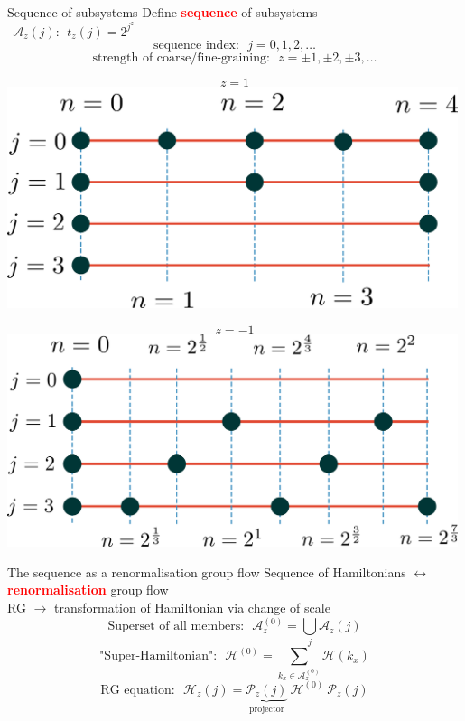 \documentclass[11pt,aspectratio=169]{beamer}
\newcommand{\focus}[1]{\textcolor{red}{\bf{#1}}}
\begin{document}
\begin{frame}{Sequence of subsystems}
	Define \focus{sequence} of subsystems\\[10pt]
{\large \(~ ~ \mathcal{A}_{z}(j): ~ ~ t_z(j) = 2^{j^z}\)}
\[\text{sequence index:}~ ~ ~ j = 0,1,2,\ldots\]
\[\text{strength of coarse/fine-graining:}~ ~ ~ z = \pm 1,\pm 2,\pm 3,\ldots\]
\begin{minipage}{0.48\textwidth}
\centering
\[ z = 1\]
\includegraphics[width=0.99\textwidth]{./figures/coarse-graining.pdf}
\end{minipage}
\hspace*{\fill}
\begin{minipage}{0.49\textwidth}
\centering
\[ z = -1\]
\includegraphics[width=0.99\textwidth]{./figures/fine-graining.pdf}
\end{minipage}
\end{frame}

\begin{frame}{The sequence as a renormalisation group flow}
	Sequence of Hamiltonians {\LARGE \(\longleftrightarrow\)} \focus{renormalisation} group flow\\[10pt]
	RG \(\longrightarrow\) transformation of Hamiltonian via change of scale\\
	\[\text{Superset of all members:}~ ~ ~ \mathcal{A}_z^{(0)} = \bigcup_j \mathcal{A}_z(j)\]
	\[\text{"Super-Hamiltonian":}~ ~ ~\mathcal{H}^{(0)} = \sum_{k_x \in \mathcal{A}_z^{(0)}} \mathcal{H}\left( k_x \right)\]
	\[\text{RG equation:}~ ~ ~\mathcal{H}_z(j) = \underbrace{\mathcal{P}_z(j)}_\text{projector} ~ \mathcal{H}^{(0)} ~ \mathcal{P}_z(j)\]
\end{frame}
\end{document}
